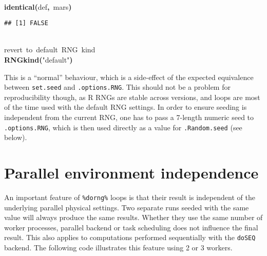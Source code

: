 \documentclass[a4paper,12pt]{article}\usepackage{graphicx, color}
\makeatletter
\newcommand{\hlfunctioncall}[1]{\textcolor[rgb]{0.501960784313725,0,0.329411764705882}{\textbf{#1}}}%
\newcommand{\hlstring}[1]{\textcolor[rgb]{0.6,0.6,1}{#1}}%
\newcommand{\hlkeyword}[1]{\textcolor[rgb]{0,0,0}{\textbf{#1}}}%
\newcommand{\hlcomment}[1]{\textcolor[rgb]{0.180392156862745,0.6,0.341176470588235}{#1}}%
\newcommand{\hlsymbol}[1]{\textcolor[rgb]{0,0,0}{#1}}%
\newcommand{\hlstd}[1]{\textcolor[rgb]{0,0,0}{#1}}%
\newenvironment{kframe}{%
 \def\FrameCommand##1{\hskip\@totalleftmargin \hskip-\fboxsep
 \colorbox{shadecolor}{##1}\hskip-\fboxsep
     \hskip-\linewidth \hskip-\@totalleftmargin \hskip\columnwidth}%
 \MakeFramed {\advance\hsize-\width
   \@totalleftmargin\z@ \linewidth\hsize
   \@setminipage}}%
 {\par\unskip\endMakeFramed}
\newenvironment{knitrout}{}{} %
\renewenvironment{knitrout}{\begin{footnotesize}}{\end{footnotesize}}
\let\code=\texttt
\makeatother
\begin{document}
\begin{knitrout}
\begin{kframe}
\begin{flushleft}
\hlstd{}\hlkeyword{\usebox{\hlnormalsizeboxclosebrace}}\hspace*{\fill}\\
\hlstd{}\hlfunctioncall{identical}\hlkeyword{(}\hlsymbol{def}\hlkeyword{,}{\ }\hlsymbol{mars}\hlkeyword{)}\mbox{}
\normalfont
\end{flushleft}
\begin{verbatim}
## [1] FALSE
\end{verbatim}
\begin{flushleft}
\ttfamily\noindent
\hspace*{\fill}\\
\hlstd{}\hlcomment{\usebox{\hlnormalsizeboxhash}{\ }revert{\ }to{\ }default{\ }RNG{\ }kind}\hspace*{\fill}\\
\hlstd{}\hlfunctioncall{RNGkind}\hlkeyword{(}\hlstring{"{}default"{}}\hlkeyword{)}\mbox{}
\normalfont
\end{flushleft}
\end{kframe}
\end{knitrout}


This is a ``normal'' behaviour, which is a side-effect of the expected equivalence between 
\code{set.seed} and \code{.options.RNG}.
This should not be a problem for reproducibility though, as R RNGs are stable across versions, 
and loops are most of the time used with the default RNG settings. 
In order to ensure seeding is independent from the current RNG, one has to pass a 
7-length numeric seed to \code{.options.RNG}, which is then used directly as a value 
for \code{.Random.seed} (see below).

\section{Parallel environment independence}
An important feature of \code{\%dorng\%} loops is that their result is
independent of the underlying parallel physical settings.
Two separate runs seeded with the same value will always produce the same
results.
Whether they use the same number of worker processes, parallel backend or
task scheduling does not influence the final result.
This also applies to computations performed sequentially with the \code{doSEQ}
backend.
The following code illustrates this feature using 2 or 3 workers.
\end{document}
